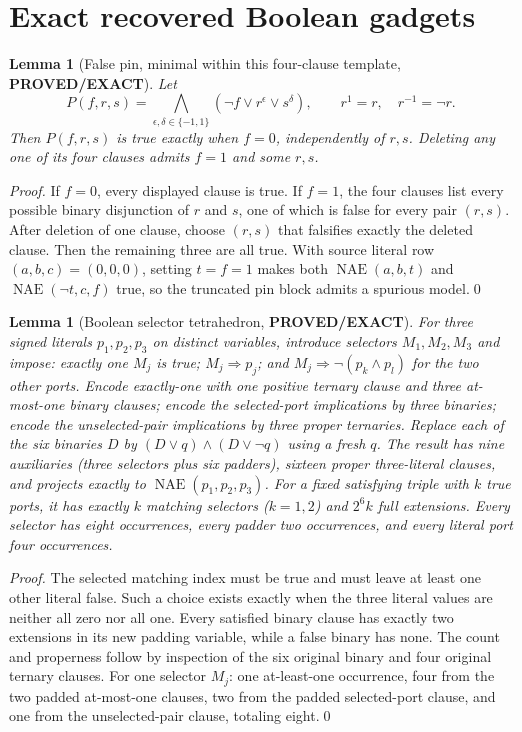 \documentclass[11pt]{article}
\newtheorem{lemma}[theorem]{Lemma}
\newcommand{\NAE}{\operatorname{NAE}}
\newcommand{\EXACT}{\textbf{PROVED/EXACT}}
\begin{document}
\section{Exact recovered Boolean gadgets}
\begin{lemma}[False pin, minimal within this four-clause template, \EXACT]
Let
\[
 P(f,r,s)=\bigwedge_{\epsilon,\delta\in\{-1,1\}}
 (\neg f\vee r^{\epsilon}\vee s^{\delta}),
 \qquad r^{1}=r,\quad r^{-1}=\neg r.
\]
Then $P(f,r,s)$ is true exactly when $f=0$, independently of $r,s$.
Deleting any one of its four clauses admits $f=1$ and some $r,s$.
\end{lemma}
\begin{proof}
If $f=0$, every displayed clause is true.  If $f=1$, the four
clauses list every possible binary disjunction of $r$ and $s$, one of which
is false for every pair $(r,s)$.  After deletion of one clause, choose
$(r,s)$ that falsifies exactly the deleted clause.  Then the remaining
three are all true.  With source literal row $(a,b,c)=(0,0,0)$, setting
$t=f=1$ makes both $\NAE(a,b,t)$ and $\NAE(\neg t,c,f)$ true,
so the truncated pin block admits a spurious model.\qed
\end{proof}

\begin{lemma}[Boolean selector tetrahedron, \EXACT]
For three signed literals $p_1,p_2,p_3$ on distinct variables, introduce
selectors $M_1,M_2,M_3$ and impose: exactly one $M_j$ is true;
$M_j\Rightarrow p_j$; and
$M_j\Rightarrow\neg(p_k\land p_l)$ for the two other ports.
Encode exactly-one with one positive ternary clause and three at-most-one
binary clauses; encode the selected-port implications by three binaries;
encode the unselected-pair implications by three proper ternaries.
Replace each of the six binaries $D$ by
$(D\vee q)\land(D\vee\neg q)$ using a fresh $q$.
The result has nine auxiliaries (three selectors plus six padders), sixteen
proper three-literal clauses, and projects exactly to $\NAE(p_1,p_2,p_3)$.
For a fixed satisfying triple with $k$ true ports, it has exactly $k$
matching selectors ($k=1,2$) and $2^6 k$ full extensions.
Every selector has eight occurrences, every padder two occurrences, and
every literal port four occurrences.
\end{lemma}
\begin{proof}
The selected matching index must be true and must leave at least one
other literal false.  Such a choice exists exactly when the three literal
values are neither all zero nor all one.  Every satisfied binary clause
has exactly two extensions in its new padding variable, while a false
binary has none.  The count and properness follow by inspection of the
six original binary and four original ternary clauses.  For one selector
$M_j$: one at-least-one occurrence, four from the two padded at-most-one
clauses, two from the padded selected-port clause, and one from the
unselected-pair clause, totaling eight.\qed
\end{proof}
\end{document}
